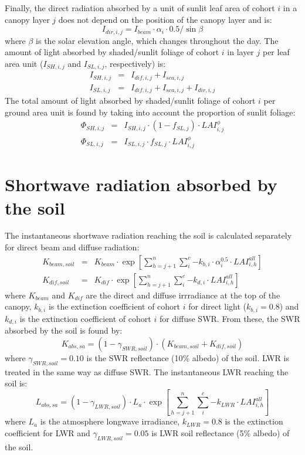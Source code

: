\documentclass[]{book}
\begin{document}
Finally, the direct radiation absorbed by a unit of sunlit leaf area of cohort \(i\) in a canopy layer \(j\) does not depend on the position of the canopy layer and is:
\begin{equation}
I_{dir,i,j} = I_{beam} \cdot \alpha_i \cdot 0.5/\sin{\beta}
\end{equation}
where \(\beta\) is the solar elevation angle, which changes throughout the day. The amount of light absorbed by shaded/sunlit foliage of cohort \(i\) in layer \(j\) per leaf area unit (\(I_{SH,i,j}\) and \(I_{SL,i,j}\), respectively) is:
\begin{eqnarray}
I_{SH,i,j} &=& I_{dif,i,j} + I_{sca,i,j} \\
I_{SL,i,j} &=& I_{dif,i,j} + I_{sca,i,j} + I_{dir,i,j}
\end{eqnarray}
The total amount of light absorbed by shaded/sunlit foliage of cohort \(i\) per ground area unit is found by taking into account the proportion of sunlit foliage:
\begin{eqnarray}
\Phi_{SH,i,j} &=& I_{SH,i,j}\cdot (1 - f_{SL,j}) \cdot LAI^{\phi}_{i,j}\\
\Phi_{SL,i,j} &=& I_{SL,i,j}\cdot f_{SL,j} \cdot LAI^{\phi}_{i,j}
\end{eqnarray}

\hypertarget{shortwave-radiation-absorbed-by-the-soil}{%
\section{Shortwave radiation absorbed by the soil}\label{shortwave-radiation-absorbed-by-the-soil}}

The instantaneous shortwave radiation reaching the soil is calculated separately for direct beam and diffuse radiation:
\begin{eqnarray}
K_{beam, soil} &=&  K_{beam} \cdot \exp\left[ \sum_{h=j+1}^{n}{\sum_{i}^{c}{-k_{b,i}\cdot \alpha_i^{0.5} \cdot LAI^{all}_{i,h}}}\right]\\
K_{dif, soil} &=& K_{dif} \cdot \exp\left[ \sum_{h=j+1}^{n}{\sum_{i}^{c}{-k_{d,i}\cdot LAI^{all}_{i,h}}}\right]
\end{eqnarray}
where \(K_{beam}\) and \(K_{dif}\) are the direct and diffuse irrradiance at the top of the canopy, \(k_{b,i}\) is the extinction coefficient of cohort \(i\) for direct light (\(k_{b,i} = 0.8\)) and \(k_{d,i}\) is the extinction coefficient of cohort \(i\) for diffuse SWR. From these, the SWR absorbed by the soil is found by:
\begin{equation}
K_{abs,sa} = (1 - \gamma_{SWR, soil})\cdot (K_{beam, soil} + K_{dif, soil})
\end{equation}
where \(\gamma_{SWR, soil} = 0.10\) is the SWR reflectance (10\% albedo) of the soil. LWR is treated in the same way as diffuse SWR. The instantaneous LWR reaching the soil is:
\begin{equation}
L_{abs,sa} = (1 - \gamma_{LWR, soil})\cdot L_{a} \cdot \exp\left[ \sum_{h=j+1}^{n}{\sum_{i}^{c}{-k_{LWR}\cdot LAI^{all}_{i,h}}}\right]
\end{equation}
where \(L_a\) is the atmosphere longwave irradiance, \(k_{LWR} = 0.8\) is the extinction coefficient for LWR and \(\gamma_{LWR, soil} = 0.05\) is LWR soil reflectance (5\% albedo) of the soil.
\end{document}
